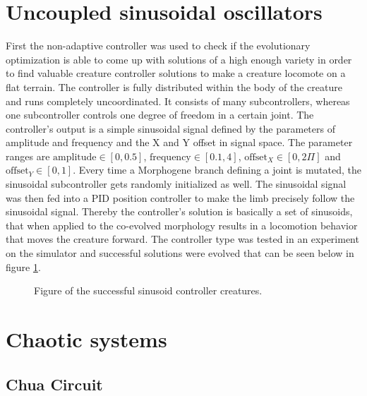 \documentclass[main]{subfiles}
\begin{document}
\section{Uncoupled sinusoidal oscillators}

First the non-adaptive controller was used to check if the evolutionary optimization is able to come up with solutions of a high enough variety in order to find valuable creature controller solutions to make a creature locomote on a flat terrain. The controller is fully distributed within the body of the creature and runs completely uncoordinated. It consists of many subcontrollers, whereas one subcontroller controls one degree of freedom in a certain joint. The controller's output is a simple sinusoidal signal defined by the parameters of amplitude and frequency and the X and Y offset in signal space. The parameter ranges are $\text{amplitude} \in [0,0.5]$, $\text{frequency} \in [0.1,4]$, $\text{offset}_X \in [0,2\Pi]$ and $\text{offset}_Y \in [0,1]$. Every time a Morphogene branch defining a joint is mutated, the sinusoidal subcontroller gets randomly initialized as well. The sinusoidal signal was then fed into a PID position controller to make the limb precisely follow the sinusoidal signal. Thereby the controller's solution is basically a set of sinusoids, that when applied to the co-evolved morphology results in a locomotion behavior that moves the creature forward. The controller type was tested in an experiment on the simulator and successful solutions were evolved that can be seen below in figure \ref{figure:successfulcreatures}.

\begin{figure}[!h]
\centering
{}
\caption[Figure of the successful sinusoid controller creatures.]{Figure of the successful sinusoid controller creatures.}
\label{figure:successfulcreatures}
\end{figure}


\section{Chaotic systems}

\lipsum[2]

\subsection{Chua Circuit}
\end{document}
